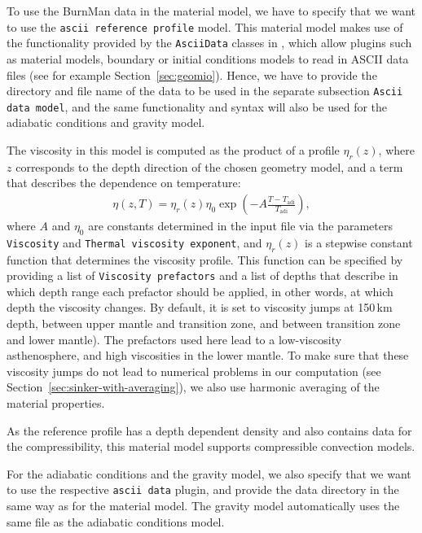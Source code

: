 To use the BurnMan data in the material model, we have to specify that we want to use the
\texttt{ascii reference profile} model. This material model makes use of the functionality provided by
the \texttt{AsciiData} classes in \aspect{}, which allow plugins such as material models,
boundary or initial conditions models to read in ASCII data files (see for example Section~\ref{sec:geomio}).
Hence, we have to provide the directory and file name of the data to be used in the separate subsection
\texttt{Ascii data model}, and the same functionality and syntax will also be used for the
adiabatic conditions and gravity model.

The viscosity in this model is computed as the product of a profile $\eta_r(z)$, where $z$ corresponds to the depth direction of the chosen geometry model, and a
term that describes the dependence on temperature:
\begin{align*}
\eta(z,T) = \eta_r(z) \eta_0 \exp\left(-A \frac{T - T_{\text{adi}}}{T_{\text{adi}}}\right),
\end{align*}
where $A$ and $\eta_0$ are constants determined in the input file via the parameters
\texttt{Viscosity} and \texttt{Thermal viscosity exponent}, and $\eta_r(z)$ is a stepwise constant
function that determines the viscosity profile. This function can be specified by providing a list of
\texttt{Viscosity prefactors} and a list of depths that describe in which depth range each prefactor
should be applied, in other words, at which depth the viscosity changes. By default, it is set
to viscosity jumps at 150\,km depth, between upper mantle and transition zone,
and between transition zone and lower mantle). The prefactors used here lead to a low-viscosity
asthenosphere, and high viscosities in the lower mantle. To make sure that these viscosity jumps
do not lead to numerical problems in our computation (see Section~\ref{sec:sinker-with-averaging}),
we also use harmonic averaging of the material properties.

As the reference profile has a depth dependent density and also contains data for the compressibility,
this material model supports compressible convection models.

For the adiabatic conditions and the gravity model, we also specify that we want to use the respective
\texttt{ascii data} plugin, and provide the data directory in the same way as for the material
model. The gravity model automatically uses the same file as the adiabatic conditions model.




